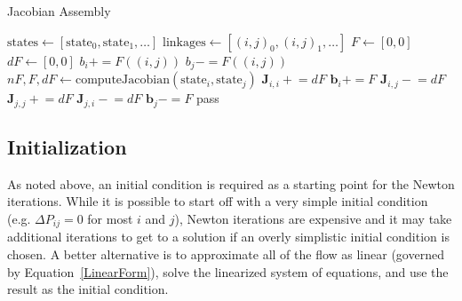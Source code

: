 \documentclass[10pt]{report}
\newcommand{\pluseq}{\ensuremath{\mathrel{+}=}}
\newcommand{\minuseq}{\ensuremath{\mathrel{-}=}}
\newcommand{\mat}[1]{\ensuremath{\mathbf{#1}}}
\begin{document}
\begin{algorithm}
  \caption{Jacobian Assembly}\label{JacobianAssembly}
  \begin{algorithmic}[1]
    \State $\text{states} \gets [\text{state}_0, \text{state}_1, \ldots]$ 
    \State $\text{linkages} \gets \left[ (i,j)_0, (i,j)_1, \ldots \right]$
    \State $F \gets [0, 0]$
    \State $dF \gets [0, 0]$
        \State $b_i \pluseq F\left((i,j)\right)$
          \State $b_j \minuseq F\left((i,j)\right)$
        \EndIf
      \Else
        \State $nF, F, dF \gets \text{computeJacobian}\left(\text{state}_i, 
        \text{state}_j\right)$
          \State $\mat{J}_{i,i} \mathrel{+}= dF$
          \State $\mat{b}_i \pluseq F$
            \State $\mat{J}_{i,j} \mathrel{-}= dF$
            \State $\mat{J}_{j,j} \mathrel{+}= dF$
            \State $\mat{J}_{j,i} \mathrel{-}= dF$ 
            \State $\mat{b}_j \minuseq F$
          \EndIf
        \Else
          \State pass
        \EndIf
      \EndIf
    \EndFor
  \end{algorithmic}
\end{algorithm}

\subsection{Initialization}
As noted above, an initial condition is required as a starting point for the
Newton iterations. While it is possible to start off with a very simple initial
condition (e.g. $\Delta P_{ij} = 0$ for most $i$ and $j$), Newton iterations are
expensive and it may take additional iterations to get to a solution if an
overly simplistic initial condition is chosen. A better alternative is to
approximate all of the flow as linear (governed by Equation~\ref{LinearForm}),
solve the linearized system of equations, and use the result as the initial
condition.
\end{document}

